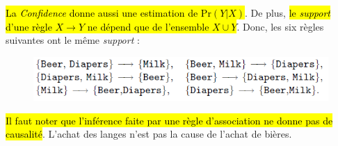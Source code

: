 \documentclass[letterpaper, 12pt]{article}
\begin{document}
			\hl{La \textit{Confidence} donne aussi une estimation
			de $\text{Pr}(Y | X)$}. De plus, \hl{le \textit{support} d'une
			règle $X \longrightarrow Y$ ne dépend que de l'ensemble
			$X \cup Y$}. Donc, les six règles suivantes ont le
			même \textit{support} :
			\begin{figure}[H]
				\centering
				\includegraphics[scale=0.725]{Images/support}
			\end{figure}\noindent
			\hl{Il faut noter que l'inférence faite par une règle 
			d'association ne donne pas de causalité}.
			L'achat des langes n'est pas la cause de l'achat de bières.
\end{document}
